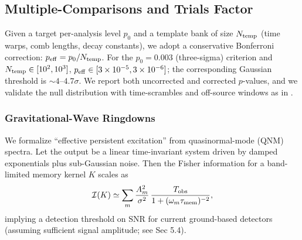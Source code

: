 \documentclass[11pt,a4paper]{article}
\theoremstyle{plain}
\theoremstyle{definition}
\theoremstyle{remark}
\begin{document}
\subsection{Multiple-Comparisons and Trials Factor}
\label{subsec:trials}
Given a target per-analysis level $p_0$ and a template bank of size $N_{\rm temp}$ (time warps, comb lengths, decay constants), we adopt a conservative Bonferroni correction: $p_{\rm eff}=p_0/N_{\rm temp}$. For the $p_0=0.003$ (three-sigma) criterion and $N_{\rm temp}\in[10^2,10^3]$, $p_{\rm eff}\in[3\times 10^{-5},3\times 10^{-6}]$; the corresponding Gaussian threshold is $\sim 4$--$4.7\sigma$. We report both uncorrected and corrected $p$-values, and we validate the null distribution with time-scrambles and off-source windows as in .


\subsubsection{Gravitational-Wave Ringdowns}
We formalize ``effective persistent excitation'' from quasinormal-mode (QNM) spectra. Let the output be a linear time-invariant system driven by damped exponentials plus sub-Gaussian noise. Then the Fisher information for a band-limited memory kernel $K$ scales as
\begin{align}
\mathcal{I}(K) \simeq \sum_{m} \frac{A_m^2}{\sigma^2}\,\frac{T_{\mathrm{obs}}}{1+(\omega_m\tau_{\rm mem})^{-2}},
\end{align}
implying a detection threshold on $\mathrm{SNR}$ for current ground-based detectors (assuming sufficient signal amplitude; see Sec 5.4).
\end{document}

